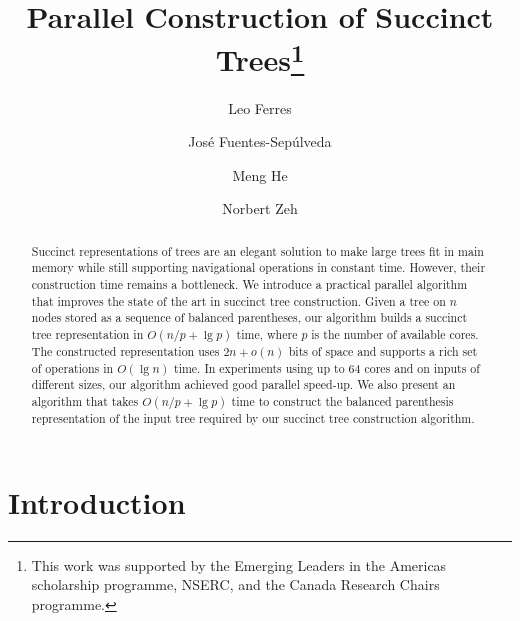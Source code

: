 \documentclass[runningheads]{llncs}
\begin{document}
\title{Parallel Construction of Succinct Trees\thanks{This work was
    supported by the Emerging Leaders in the Americas scholarship
    programme, NSERC, and the Canada Research Chairs programme.}}

\author{Leo Ferres
  \and
  Jos\'e Fuentes-Sep\'ulveda
  \and
  Meng He
  \and
  Norbert Zeh}




\maketitle

\begin{abstract}
  Succinct representations of trees are an elegant solution to
  make large trees fit in main memory while still supporting
  navigational operations in constant time.  However, their construction
  time remains a bottleneck.  We
  introduce a practical parallel algorithm that improves the state of
  the art in succinct tree construction.  Given a tree on $n$ nodes
  stored as a sequence of balanced parentheses, our algorithm
  builds a succinct tree representation in $O(n/p+\lg p)$ time,
  where $p$ is the number of available cores.  The constructed
  representation uses $2n + o(n)$ bits of space and supports a rich
  set of operations in $O(\lg n)$ time.  In experiments using up to
  64 cores and on inputs of different sizes, our algorithm
  achieved good parallel speed-up.
  We also present an
  algorithm that takes $O(n/p + \lg p)$ time to construct the
  balanced parenthesis representation of the input tree required by
  our succinct tree construction algorithm.
\end{abstract}
%


\section{Introduction}
\label{sec:introduction}

\end{document}
